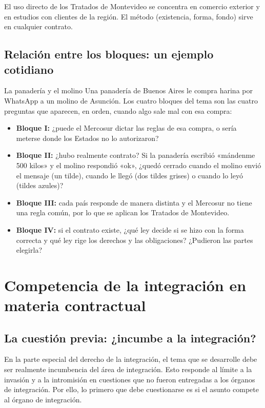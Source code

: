 \documentclass[12pt,oneside]{book}
\begin{document}
\begin{note}
El uso directo de los Tratados de Montevideo se concentra en comercio exterior y en estudios con clientes de la región. El método (existencia, forma, fondo) sirve en cualquier contrato.
\end{note}

\section{Relación entre los bloques: un ejemplo cotidiano}

\begin{example}{La panadería y el molino}
Una panadería de Buenos Aires le compra harina por WhatsApp a un molino de Asunción. Los cuatro bloques del tema son las cuatro preguntas que aparecen, en orden, cuando algo sale mal con esa compra:
\begin{itemize}
    \item \textbf{Bloque I:} ¿puede el Mercosur dictar las reglas de esa compra, o sería meterse donde los Estados no lo autorizaron?
    \item \textbf{Bloque II:} ¿hubo realmente contrato? Si la panadería escribió «mándenme 500 kilos» y el molino respondió «ok», ¿quedó cerrado cuando el molino envió el mensaje (un tilde), cuando le llegó (dos tildes grises) o cuando lo leyó (tildes azules)?
    \item \textbf{Bloque III:} cada país responde de manera distinta y el Mercosur no tiene una regla común, por lo que se aplican los Tratados de Montevideo.
    \item \textbf{Bloque IV:} si el contrato existe, ¿qué ley decide si se hizo con la forma correcta y qué ley rige los derechos y las obligaciones? ¿Pudieron las partes elegirla?
\end{itemize}
\end{example}

\chapter[Competencia de la integración]{Competencia de la integración en materia contractual}

\section{La cuestión previa: ¿incumbe a la integración?}

En la parte especial del derecho de la integración, el tema que se desarrolle debe ser realmente incumbencia del área de integración. Esto responde al límite a la invasión y a la intromisión en cuestiones que no fueron entregadas a los órganos de integración. Por ello, lo primero que debe cuestionarse es si el asunto compete al órgano de integración.
\end{document}
